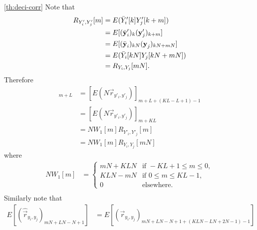 \documentclass[a4paper, openany, oneside]{memoir}
\begin{document}
\begin{blockProofTheorem}{\ref{th:deci-corr}}
    Note that
    \begin{align*}
        R_{Y'_i,Y'_j}[m]
        &= E(\bar{Y}'_i[k]Y'_j[k+m]) \\
        &= E[(\bar{\boldsymbol{\mathbf{y}}}'_i)_{k}(\boldsymbol{\mathbf{y}}'_j)_{k+m}] \\
        &= E[(\bar{\boldsymbol{\mathbf{y}}}_i)_{kN}(\boldsymbol{\mathbf{y}}_j)_{kN+mN}] \\
        &= E(\bar{Y}_i[kN]Y_j[kN+mN]) \\
        &= R_{Y_i,Y_j}[mN].
    \end{align*}
    Therefore
    \begin{align*}
        [E(N\hat{\vec{r}}_{y'_i,y'_j})]_{m+L}
        &= [E(N\vec{r}_{y'_i,y'_j})]_{m+L+(KL-L+1)-1} \\
        &= [E(N\vec{r}_{y'_i,y'_j})]_{m+KL} \\
        &= N W_1[m] R_{Y'_i,Y'_j}[m] \\
        &= N W_1[m] R_{Y_i,Y_j}[mN]
    \end{align*}
    where
    \begin{align*}
        NW_1[m] &= \begin{cases}
            mN+KLN & \text{if } -KL+1 \le m \le 0, \\
            KLN-mN & \text{if } 0 \le m \le KL - 1, \\
            0 & \text{elsewhere}.
        \end{cases} \\
    \end{align*}
    Similarly note that
    \begin{align*}
        E[(\hat{\vec{r}}_{y_i,y_j})_{mN+LN-N+1}] &= E[(\vec{r}_{y_i,y_j})_{mN+LN-N+1 +(KLN-LN+2N-1) - 1}] \\

\end{align*}
\end{blockProofTheorem}
\end{document}
